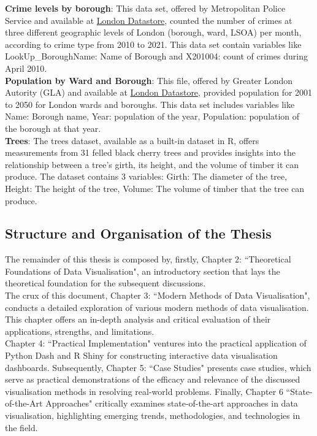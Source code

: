 \documentclass{article}\usepackage[]{graphicx}\usepackage[]{xcolor}
\begin{document}
\noindent
\textbf{Crime levels by borough}: This data set, offered by Metropolitan Police Service and available at \href{https://data.london.gov.uk/dataset/recorded_crime_summary}{London Datastore}, counted the number of crimes at three different geographic levels of London (borough, ward, LSOA) per month, according to crime type from 2010 to 2021. This data set contain variables like LookUp\_BoroughName: Name of Borough and X201004: count of crimes during April 2010.\\

\noindent
\textbf{Population by Ward and Borough}: This file, offered by Greater London Autority (GLA) and available at \href{https://data.london.gov.uk/dataset/land-area-and-population-density-ward-and-borough}{London Datastore}, provided population for 2001 to 2050 for London wards and boroughs. This data set includes variables like Name: Borough name, Year: population of the year, Population: population of the borough at that year.\\

\noindent
\textbf{Trees}: The trees dataset, available as a built-in dataset in R, offers measurements from 31 felled black cherry trees and provides insights into the relationship between a tree's girth, its height, and the volume of timber it can produce. The dataset contains 3 variables: Girth: The diameter of the tree, Height: The height of the tree, Volume: The volume of timber that the tree can produce.\\

\subsection{Structure and Organisation of the Thesis}

The remainder of this thesis is composed by, firstly, Chapter 2: ``Theoretical Foundations of Data Visualisation", an introductory section that lays the theoretical foundation for the subsequent discussions.\\

\noindent 
The crux of this document, Chapter 3: ``Modern Methods of Data Visualisation", conducts a detailed exploration of various modern methods of data visualisation. This chapter offers an in-depth analysis and critical evaluation of their applications, strengths, and limitations.\\

\noindent 
Chapter 4: ``Practical Implementation" ventures into the practical application of Python Dash and R Shiny for constructing interactive data visualisation dashboards. Subsequently, Chapter 5: ``Case Studies" presents case studies, which serve as practical demonstrations of the efficacy and relevance of the discussed visualisation methods in resolving real-world problems. Finally, Chapter 6 ``State-of-the-Art Approaches" critically examines state-of-the-art approaches in data visualisation, highlighting emerging trends, methodologies, and technologies in the field.
\end{document}
